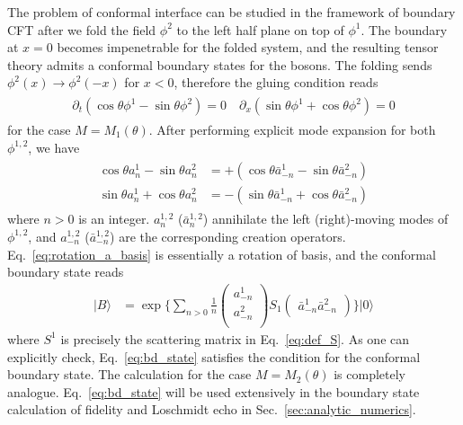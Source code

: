 The problem of conformal interface can be studied in the framework of boundary CFT\cite{cardy_boundary_2004,cardy_conformal_1984} after we fold the field $\phi^2$ to the left half plane on top of $\phi^1$\cite{oshikawa_boundary_2010}. The boundary at $x=0$ becomes impenetrable for the folded system, and the resulting tensor theory admits a conformal boundary states for the bosons. The folding sends $\phi^2(x)\rightarrow\phi^2(-x)$ for $x<0$, therefore the gluing condition reads
\begin{eqnarray}\begin{aligned}
\partial_t(\cos\theta\phi^1-\sin\theta\phi^2)=0 \quad
\partial_x(\sin\theta\phi^1+\cos\theta\phi^2)=0 
\end{aligned}\end{eqnarray}
for the case $M=M_1(\theta)$. After performing explicit mode expansion for both $\phi^{1,2}$, we have
\begin{eqnarray}\begin{aligned}
\label{eq:rotation_a_basis}
\cos\theta a_n^1-\sin\theta a_n^2 &= +( \cos\theta\bar{a}_{-n}^1-\sin\theta \bar{a}_{-n}^2 ) \\
\sin\theta a_n^1+\cos\theta a_n^2 &= -( \sin\theta\bar{a}_{-n}^1+\cos\theta \bar{a}_{-n}^2 ) 
\end{aligned}\end{eqnarray}
where $n>0$ is an integer. $a_n^{1,2}$ ($\bar{a}_n^{1,2}$) annihilate the left (right)-moving modes of $\phi^{1,2}$, and $a_{-n}^{1,2}$ ($\bar{a}_{-n}^{1,2}$) are the corresponding creation operators. Eq.~\eqref{eq:rotation_a_basis} is essentially a rotation of basis, and the conformal boundary state reads\cite{oshikawa_boundary_2010}
\begin{equation}
\label{eq:bd_state}
\begin{aligned}
| B \rangle 
& =  \exp\Big\{ \sum_{n > 0 } \frac{1}{n}
\begin{pmatrix}
a_{-n}^1\\
a_{-n}^2\\                              
\end{pmatrix}
S_1
\begin{pmatrix}
\bar{a}_{-n}^1  \bar{a}_{-n}^2
\end{pmatrix} \Big\} |0\rangle
\end{aligned}
\end{equation}
where $S^1$ is precisely the scattering matrix in Eq.~\eqref{eq:def_S}. As one can explicitly check, Eq.~\eqref{eq:bd_state} satisfies the condition for the conformal boundary state\cite{oshikawa_boundary_2010}. The calculation for the case $M=M_2(\theta)$ is completely analogue. Eq.~\eqref{eq:bd_state} will be used extensively in the boundary state calculation of fidelity and Loschmidt echo in Sec.~\ref{sec:analytic_numerics}. 

